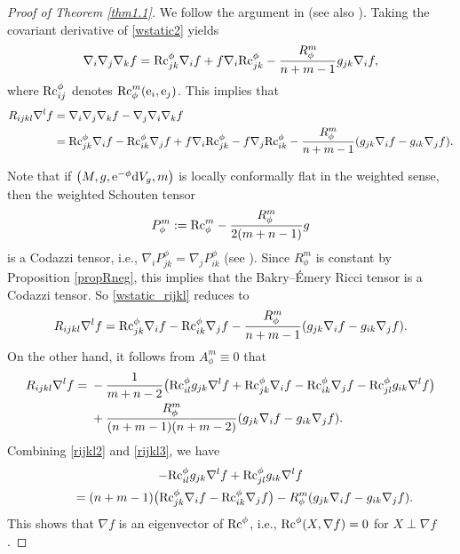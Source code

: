 \documentclass[10pt,a4paper]{amsart}
\numberwithin{equation}{section}
\begin{document}
\begin{proof}[Proof of Theorem \ref{thm1.1}]
We follow the argument in \cite{Catino} (see also \cite{He}).
Taking the covariant derivative of \eqref{wstatic2} yields
 \begin{equation*}
 \nabla_i\nabla_j\nabla_kf={\rm Rc}^\phi_{jk}\nabla_if+f\nabla_i{\rm Rc}^\phi_{jk}-\frac{R_\phi^m}{n+m-1}g_{jk}\nabla_if,
 \end{equation*}
 where ${\rm Rc}^\phi_{ij}$ denotes ${\rm Rc}_\phi^m({\rm e}_i,{\rm e}_j)$. This implies that
 \begin{align}\label{wstatic_rijkl}
 R_{ijkl}\nabla^l f& = \nabla_i\nabla_j\nabla_kf-\nabla_j\nabla_i\nabla_kf\\
& = {\rm Rc}^\phi_{jk}\nabla_if-{\rm Rc}^\phi_{ik}\nabla_jf+f\nabla_i{\rm Rc}^\phi_{jk}-f\nabla_j{\rm Rc}^\phi_{ik}
 -\frac{R_\phi^m}{n+m-1}(g_{jk}\nabla_if-g_{ik}\nabla_jf).\nonumber
 \end{align}

Note that if $\bigl(M,g,{\rm e}^{-\phi}{\rm d}V_g,m\bigr)$ is locally conformally flat in the weighted sense, then the weighted Schouten tensor
\[P_\phi^m:={\rm Rc}_\phi^m-\frac{R_\phi^m}{2(m+n-1)}g\] is a Codazzi tensor, i.e., $\nabla_iP^\phi_{jk}=\nabla_jP^\phi_{ik}$ (see \cite[Lemma 3.2]{Case2}). Since $R_\phi^m$ is constant by Proposition \ref{propRneg}, this implies that the Bakry--\'{E}mery Ricci tensor is a Codazzi tensor.
So \eqref{wstatic_rijkl} reduces to
\begin{equation}\label{rijkl2}
 R_{ijkl}\nabla^l f= {\rm Rc}^\phi_{jk}\nabla_if-{\rm Rc}^\phi_{ik}\nabla_jf-\frac{R_\phi^m}{n+m-1}(g_{jk}\nabla_if-g_{ik}\nabla_jf).
 \end{equation}
On the other hand, it follows from $A_\phi^m\equiv 0$ that
\begin{align}\label{rijkl3}
 \nonumber R_{ijkl}\nabla^lf={}&-\frac{1}{m+n-2}\bigl({\rm Rc}^\phi_{il}g_{jk}\nabla^lf+{\rm Rc}^\phi_{jk}\nabla_if-{\rm Rc}_{ik}^\phi\nabla_jf-{\rm Rc}^\phi_{jl}g_{ik}\nabla^lf\bigr)\\
&+\frac{R_\phi^m}{(n+m-1)(n+m-2)}(g_{jk}\nabla_if-g_{ik}\nabla_jf).
\end{align}
Combining \eqref{rijkl2} and \eqref{rijkl3}, we have
\begin{gather}
\nonumber -{\rm Rc}_{il}^\phi g_{jk}\nabla^lf +{\rm Rc}_{jl}^\phi g_{ik}\nabla^lf\\
\qquad{} =(n+m-1)\bigl({\rm Rc}_{jk}^\phi\nabla_if-{\rm Rc}_{ik}^\phi\nabla_jf\bigr)-R_\phi^m(g_{jk}\nabla_if-g_{ik}\nabla_jf).\label{rijkl4}
\end{gather}
 This shows that $\nabla f$ is an eigenvector of ${\rm Rc}^\phi$, i.e., ${\rm Rc}^\phi(X,\nabla f)=0$ for $X\perp \nabla f$.


\end{proof}
\end{document}

